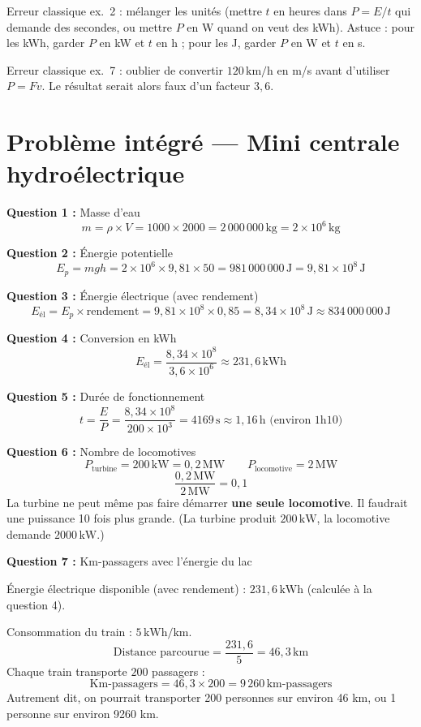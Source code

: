 \documentclass[11pt,a4paper]{article}
\newcommand{\corrbox}[1]{
\begin{tcolorbox}[colback=correctgreen!8!white,colframe=correctgreen!60!black]
#1
\end{tcolorbox}
}
\newcommand{\warnbox}[1]{
\begin{tcolorbox}[colback=warnred!8!white,colframe=warnred!60!black,title=\textbf{Erreurs fr\'equentes}]
#1
\end{tcolorbox}
}
\begin{document}
\warnbox{
Erreur classique ex.~2 : m\'elanger les unit\'es (mettre $t$ en heures dans $P = E/t$ qui demande des secondes, ou mettre $P$ en W quand on veut des kWh). Astuce : pour les kWh, garder $P$ en kW et $t$ en h ; pour les J, garder $P$ en W et $t$ en s.

\vspace{0.2cm}
Erreur classique ex.~7 : oublier de convertir $120\,\text{km/h}$ en m/s avant d'utiliser $P = Fv$. Le r\'esultat serait alors faux d'un facteur $3{,}6$.
}

\section{Probl\`eme int\'egr\'e --- Mini centrale hydro\'electrique}

\corrbox{
\textbf{Question 1 :} Masse d'eau
\[m = \rho \times V = 1000 \times 2000 = 2\,000\,000\,\text{kg} = 2 \times 10^{6}\,\text{kg}\]

\textbf{Question 2 :} \'Energie potentielle
\[E_p = mgh = 2 \times 10^{6} \times 9{,}81 \times 50 = 981\,000\,000\,\text{J} = 9{,}81 \times 10^{8}\,\text{J}\]

\textbf{Question 3 :} \'Energie \'electrique (avec rendement)
\[E_{\text{\'el}} = E_p \times \text{rendement} = 9{,}81 \times 10^{8} \times 0{,}85 = 8{,}34 \times 10^{8}\,\text{J} \approx 834\,000\,000\,\text{J}\]

\textbf{Question 4 :} Conversion en kWh
\[E_{\text{\'el}} = \frac{8{,}34 \times 10^{8}}{3{,}6 \times 10^{6}} \approx 231{,}6\,\text{kWh}\]

\textbf{Question 5 :} Dur\'ee de fonctionnement
\[t = \frac{E}{P} = \frac{8{,}34 \times 10^{8}}{200 \times 10^{3}} = 4169\,\text{s} \approx 1{,}16\,\text{h} \text{ (environ 1h10)}\]

\textbf{Question 6 :} Nombre de locomotives
\[
P_{\text{turbine}} = 200\,\text{kW} = 0{,}2\,\text{MW}
\qquad
P_{\text{locomotive}} = 2\,\text{MW}
\]
\[
\frac{0{,}2\,\text{MW}}{2\,\text{MW}} = 0{,}1
\]
La turbine ne peut m\^eme pas faire d\'emarrer \textbf{une seule locomotive}. Il faudrait une puissance 10 fois plus grande. (La turbine produit $200\,\text{kW}$, la locomotive demande $2000\,\text{kW}$.)

\textbf{Question 7 :} Km-passagers avec l'\'energie du lac

\'Energie \'electrique disponible (avec rendement) : $231{,}6\,\text{kWh}$ (calcul\'ee \`a la question 4).

Consommation du train : $5\,\text{kWh/km}$.
\[
\text{Distance parcourue} = \frac{231{,}6}{5} = 46{,}3\,\text{km}
\]
Chaque train transporte $200$ passagers :
\[
\text{Km-passagers} = 46{,}3 \times 200 = 9\,260\,\text{km-passagers}
\]
Autrement dit, on pourrait transporter 200 personnes sur environ 46 km, ou 1 personne sur environ 9260 km.
}
\end{document}
